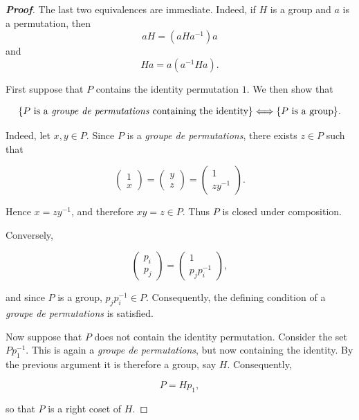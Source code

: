 \documentclass[a4paper,11pt]{article}
\begin{document}
\begin{proof}[\normalfont\bfseries Proof]
	
	The last two equivalences are immediate. Indeed, if \(H\) is a group and \(a\) is a permutation, then
	\[
	aH=(aHa^{-1})a
	\]
	and
	\[
	Ha=a(a^{-1}Ha).
	\]
	
	First suppose that \(P\) contains the identity permutation \(1\). We then show that
	
	\[
	\{\text{\(P\) is a \textit{groupe de permutations} containing the identity}\}
	\Longleftrightarrow
	\{\text{\(P\) is a group}\}.
	\]
	
	Indeed, let \(x,y\in P\). Since \(P\) is a \textit{groupe de permutations}, there exists \(z\in P\) such that
	
	\[
	\left(
	\begin{array}{c}
		1\\
		x
	\end{array}
	\right)
	=
	\left(
	\begin{array}{c}
		y\\
		z
	\end{array}
	\right)
	=
	\left(
	\begin{array}{c}
		1\\
		zy^{-1}
	\end{array}
	\right).
	\]
	
	Hence \(x=zy^{-1}\), and therefore \(xy=z\in P\). Thus \(P\) is closed under composition.
	
	Conversely,
	
	\[
	\left(
	\begin{array}{c}
		p_i\\
		p_j
	\end{array}
	\right)
	=
	\left(
	\begin{array}{c}
		1\\
		p_jp_i^{-1}
	\end{array}
	\right),
	\]
	
	and since \(P\) is a group, \(p_jp_i^{-1}\in P\). Consequently, the defining condition of a \textit{groupe de permutations} is satisfied.
	
	Now suppose that \(P\) does not contain the identity permutation. Consider the set \(Pp_1^{-1}\). This is again a \textit{groupe de permutations}, but now containing the identity. By the previous argument it is therefore a group, say \(H\). Consequently,
	
	\[
	P=Hp_1,
	\]
	
	so that \(P\) is a right coset of \(H\).
	

\end{proof}
\end{document}
